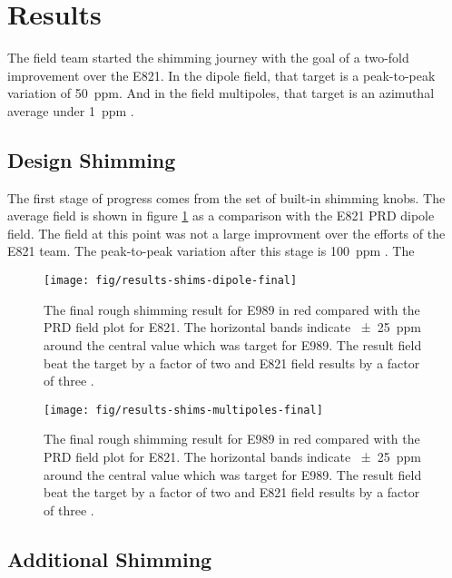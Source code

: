 \section{Results}

The field team started the shimming journey with the goal of a two-fold improvement over the E821.  In the dipole field, that target is a peak-to-peak variation of \SI{50}{ppm}. And in the field multipoles, that target is an azimuthal average under \SI{1}{ppm} .

\subsection{Design Shimming}

The first stage of progress comes from the set of built-in shimming knobs.  The average field is shown in figure \ref{fig:results-shims-dipole-final} as a comparison with the E821 PRD dipole field.  The field at this point was not a large improvment over the efforts of the E821 team.  The peak-to-peak variation after this stage is \SI{100}{ppm} .  The 

\begin{figure}
\label{fig:results-shims-dipole-final}
\texttt{[image: fig/results-shims-dipole-final]}
\caption{The final rough shimming result for E989 in red compared with the PRD field plot for E821.  The horizontal bands indicate \SI{\pm 25}{ppm} around the central value which was target for E989.  The result field beat the target by a factor of two and E821 field results by a factor of three .}
\end{figure}

\begin{figure}
\label{fig:results-shims-multipoles-final}
\texttt{[image: fig/results-shims-multipoles-final]}
\caption{The final rough shimming result for E989 in red compared with the PRD field plot for E821.  The horizontal bands indicate \SI{\pm 25}{ppm} around the central value which was target for E989.  The result field beat the target by a factor of two and E821 field results by a factor of three .}
\end{figure}

\subsection{Additional Shimming}

